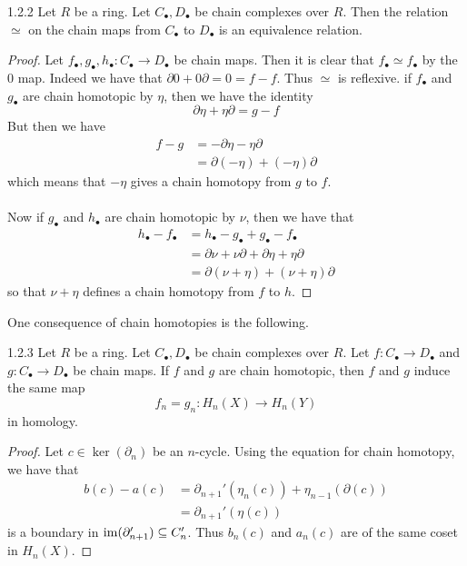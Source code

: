 \documentclass[a4paper]{article}
\begin{document}
\begin{lmm}{}{1.2.2} Let $R$ be a ring. Let $C_\bullet,D_\bullet$ be chain complexes over $R$. Then the relation $\simeq$ on the chain maps from $C_\bullet$ to $D_\bullet$ is an equivalence relation. \tcbline
\begin{proof}
Let $f_\bullet,g_\bullet,h_\bullet:C_\bullet\to D_\bullet$ be chain maps. Then it is clear that $f_\bullet\simeq f_\bullet$ by the $0$ map. Indeed we have that $\partial 0+0\partial=0=f-f$. Thus $\simeq$ is reflexive. if $f_\bullet$ and $g_\bullet$ are chain homotopic by $\eta$, then we have the identity $$\partial\eta+\eta\partial=g-f$$ But then we have 
\begin{align*}
f-g&=-\partial\eta-\eta\partial\\
&=\partial(-\eta)+(-\eta)\partial
\end{align*}
which means that $-\eta$ gives a chain homotopy from $g$ to $f$. \\~\\

Now if $g_\bullet$ and $h_\bullet$ are chain homotopic by $\nu$, then we have that 
\begin{align*}
h_\bullet-f_\bullet&=h_\bullet-g_\bullet+g_\bullet-f_\bullet\\
&=\partial\nu+\nu\partial+\partial\eta+\eta\partial\\
&=\partial(\nu+\eta)+(\nu+\eta)\partial
\end{align*}
so that $\nu+\eta$ defines a chain homotopy from $f$ to $h$. 
\end{proof}
\end{lmm}

One consequence of chain homotopies is the following. 

\begin{lmm}{}{1.2.3} Let $R$ be a ring. Let $C_\bullet,D_\bullet$ be chain complexes over $R$. Let $f:C_\bullet\to D_\bullet$ and $g:C_\bullet\to D_\bullet$ be chain maps. If $f$ and $g$ are chain homotopic, then $f$ and $g$ induce the same map $$f_n=g_n:H_n(X)\to H_n(Y)$$ in homology. \tcbline
\begin{proof}
Let $c\in\ker(\partial_n)$ be an $n$-cycle. Using the equation for chain homotopy, we have that 
\begin{align*}
b(c)-a(c)&=\partial_{n+1}'(\eta_n(c))+\eta_{n-1}(\partial(c))\\
&=\partial_{n+1}'(\eta(c))
\end{align*}
 is a boundary in $\operatorname{im}(\partial_{n+1}')\subseteq C_n'$. Thus $b_n(c)$ and $a_n(c)$ are of the same coset in $H_n(X)$. 
\end{proof}
\end{lmm}
\end{document}
